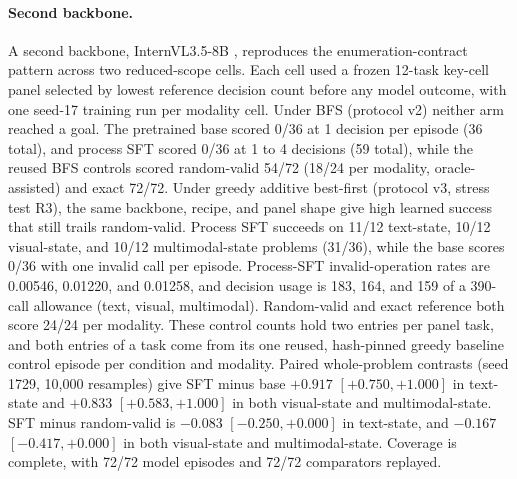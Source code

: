 \paragraph{Second backbone.} A second backbone, InternVL3.5-8B \citep{wang2025internvl35}, reproduces the enumeration-contract pattern across two reduced-scope cells. Each cell used a frozen 12-task key-cell panel selected by lowest reference decision count before any model outcome, with one seed-17 training run per modality cell. Under BFS (protocol v2) neither arm reached a goal. The pretrained base scored 0/36 at 1 decision per episode (36 total), and process SFT scored 0/36 at 1 to 4 decisions (59 total), while the reused BFS controls scored random-valid 54/72 (18/24 per modality, oracle-assisted) and exact 72/72.
Under greedy additive best-first (protocol v3, stress test R3), the same backbone, recipe, and panel shape give high learned success that still trails random-valid. Process SFT succeeds on 11/12 text-state, 10/12 visual-state, and 10/12 multimodal-state problems (31/36), while the base scores 0/36 with one invalid call per episode. Process-SFT invalid-operation rates are 0.00546, 0.01220, and 0.01258, and decision usage is 183, 164, and 159 of a 390-call allowance (text, visual, multimodal). Random-valid and exact reference both score 24/24 per modality. These control counts hold two entries per panel task, and both entries of a task come from its one reused, hash-pinned greedy baseline control episode per condition and modality. Paired whole-problem contrasts (seed 1729, 10,000 resamples) give SFT minus base $+0.917$ $[+0.750, +1.000]$ in text-state and $+0.833$ $[+0.583, +1.000]$ in both visual-state and multimodal-state. SFT minus random-valid is $-0.083$ $[-0.250, +0.000]$ in text-state, and $-0.167$ $[-0.417, +0.000]$ in both visual-state and multimodal-state. Coverage is complete, with 72/72 model episodes and 72/72 comparators replayed.
